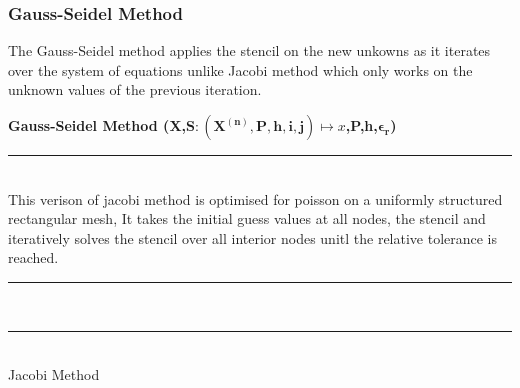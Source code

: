 \subsubsection{Gauss-Seidel Method}
The Gauss-Seidel method applies the stencil on the new unkowns as it iterates over the system of equations unlike Jacobi method which only works on the unknown values of the previous iteration.\\[2mm]
\begin{algorithm}[H]
    \textbf{Gauss-Seidel Method (X,$\mathbf{S:(X^{(n)},P,h,i,j)} \mapsto x$,P,h,$\mathbf{\epsilon_r}$)}\\[-1pt]
    \par\noindent\rule{\textwidth}{0.4pt} \\
    This verison of jacobi method is optimised for poisson on a uniformly structured rectangular mesh, It takes the initial guess values at all nodes, the stencil and iteratively solves the stencil over all interior nodes unitl the relative tolerance is reached.  \\[2mm]
    \par\noindent\rule{\textwidth}{0.4pt} \\
    \par\noindent\rule{\textwidth}{0.4pt} \\[2mm]
    \caption{Jacobi Method}
\end{algorithm}
